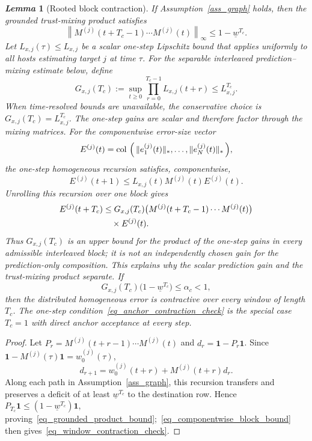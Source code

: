 \documentclass[letterpaper,journal]{IEEEtran}
\def\col#1{\mathop{{\rm col}\,\left(\,#1\,\right)}}
\newtheorem{lemma}{\it Lemma}%
\begin{document}
\begin{lemma}[Rooted block contraction]\label{lem_rooted_block_contraction}
If Assumption~\ref{ass_graph} holds, then the grounded trust-mixing product satisfies
\begin{equation}
    \left\|
    M^{(j)}(t+T_c-1)\cdots M^{(j)}(t)
    \right\|_{\infty}
    \le 1-\underline w^{T_c} .
    \label{eq_grounded_product_bound}
\end{equation}
Let $L_{x,j}(\tau)\le L_{x,j}$ be a scalar one-step Lipschitz bound that applies uniformly to all hosts estimating target $j$ at time $\tau$. For the separable interleaved prediction--mixing estimate below, define
\begin{equation}
    G_{x,j}(T_c)
    :=\sup_{t\ge0}\prod_{r=0}^{T_c-1}L_{x,j}(t+r)
    \le L_{x,j}^{T_c}.
\end{equation}
When time-resolved bounds are unavailable, the conservative choice is $G_{x,j}(T_c)=L_{x,j}^{T_c}$. The one-step gains are scalar and therefore factor through the mixing matrices. For the componentwise error-size vector
\begin{equation}\label{eq_E}
E^{(j)}(t)=\col{\|e_1^{(j)}(t)\|_*,\ldots,\|e_N^{(j)}(t)\|_*},
\end{equation}
the one-step homogeneous recursion satisfies, componentwise,
\begin{equation}
E^{(j)}(t+1)
\le L_{x,j}(t)M^{(j)}(t)E^{(j)}(t).
\end{equation}
Unrolling this recursion over one block gives
\begin{align}
E^{(j)}(t+T_c)
&\le G_{x,j}(T_c)
\big(M^{(j)}(t+T_c-1)\cdots M^{(j)}(t)\big)\notag\\
&\quad\times E^{(j)}(t).
\label{eq_componentwise_block_bound}
\end{align}
Thus $G_{x,j}(T_c)$ is an upper bound for the product of the one-step gains in every admissible interleaved block; it is not an independently chosen gain for the prediction-only composition. This explains why the scalar prediction gain and the trust-mixing product separate. If
\begin{equation}
    G_{x,j}(T_c)\big(1-\underline w^{T_c}\big)
    \le \alpha_c<1,
    \label{eq_window_contraction_check}
\end{equation}
then the distributed homogeneous error is contractive over every window of length $T_c$. The one-step condition~\eqref{eq_anchor_contraction_check} is the special case $T_c=1$ with direct anchor acceptance at every step.
\end{lemma}
\begin{proof}
Let $P_r=M^{(j)}(t+r-1)\cdots M^{(j)}(t)$ and $d_r=\mathbf1-P_r\mathbf1$. Since $\mathbf1-M^{(j)}(\tau)\mathbf1=w_0^{(j)}(\tau)$,
\[
d_{r+1}=w_0^{(j)}(t+r)+M^{(j)}(t+r)d_r.
\]
Along each path in Assumption~\ref{ass_graph}, this recursion transfers and preserves a deficit of at least $\underline w^{T_c}$ to the destination row. Hence $P_{T_c}\mathbf1\le(1-\underline w^{T_c})\mathbf1$, proving~\eqref{eq_grounded_product_bound};~\eqref{eq_componentwise_block_bound} then gives~\eqref{eq_window_contraction_check}.
\end{proof}
\end{document}
